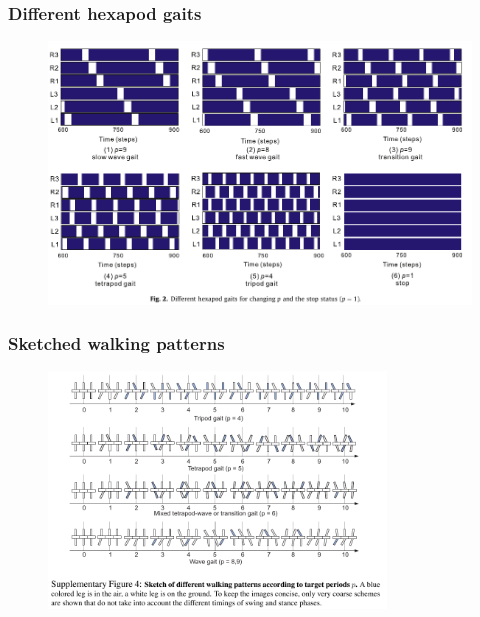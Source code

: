 \documentclass{beamer}
\begin{document}
\begin{frame}
\frametitle{Different hexapod gaits}
\begin{figure}
\center
\includegraphics[width=1\textwidth]{figs/different-hexapod-gaits.pdf}
\end{figure}
\end{frame}

\begin{frame}
\frametitle{Sketched walking patterns}
\begin{figure}
\center
\includegraphics[width=0.8\textwidth]{figs/walking-pattern-sketch.pdf}
\end{figure}
\end{frame}
\end{document}
